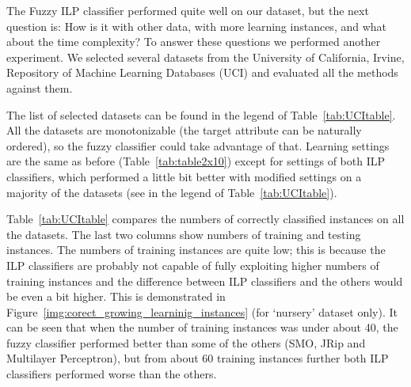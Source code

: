 The Fuzzy ILP classifier performed quite well on our dataset, but the next question is: How is it with other data, with more learning instances, and what about the time complexity? To answer these questions we performed another experiment. We selected several datasets from the University of California, Irvine, Repository of Machine Learning Databases (UCI) \citep{biblio:UCI} and evaluated all the methods against them. 



The list of selected datasets can be found in the legend of Table~\ref{tab:UCItable}. All the datasets are monotonizable (the target attribute can be naturally ordered), so the fuzzy classifier could take advantage of that. Learning settings are the same as before (Table~\ref{tab:table2x10}) except for settings of both ILP classifiers, which  performed a little bit better with modified settings on a majority of the datasets (see in the legend of Table~\ref{tab:UCItable}). 

Table~\ref{tab:UCItable} compares the numbers of correctly classified instances on all the datasets. The last two columns show numbers of training and testing instances. The numbers of training instances are quite low; this is because the ILP classifiers are probably not capable of fully exploiting higher numbers of training instances and the difference between ILP classifiers and the others would be even a bit higher. This is demonstrated in Figure~\ref{img:corect_growing_learninig_instances} (for `nursery' dataset only). It can be seen that when the number of training instances was under about 40, the fuzzy classifier performed better than some of the others (SMO, JRip and Multilayer Perceptron), but from about 60 training instances further both ILP classifiers performed worse than the others.


